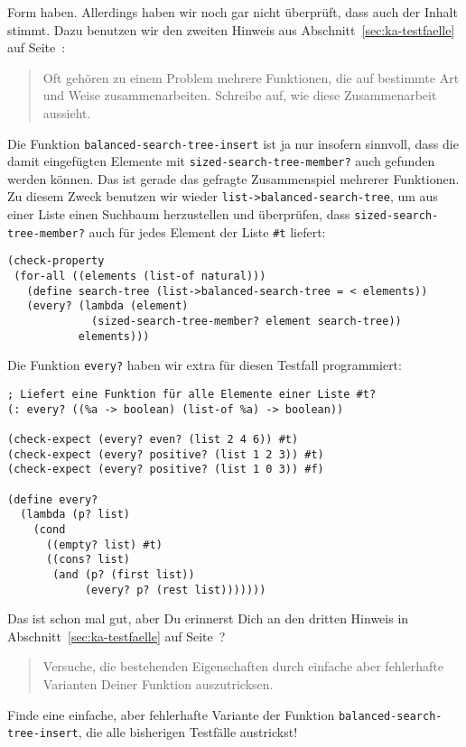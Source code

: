 Form haben.  Allerdings haben wir noch gar nicht überprüft, dass auch
der Inhalt stimmt.  Dazu benutzen wir den zweiten Hinweis aus
Abschnitt~\ref{sec:ka-testfaelle} auf
Seite~\pageref{sec:ka-testfaelle}:
%
\begin{quote}
  Oft gehören zu einem Problem mehrere Funktionen, die auf bestimmte
  Art und \mbox{Weise} zusammenarbeiten.  Schreibe auf, wie diese
  Zusammenarbeit aussieht.
\end{quote}
%
Die Funktion \lstinline{balanced-search-tree-insert} ist ja nur
insofern sinnvoll, dass die damit eingefügten Elemente mit
\lstinline{sized-search-tree-member?} auch gefunden werden können. Das
ist gerade das gefragte Zusammenspiel mehrerer Funktionen.  Zu diesem
Zweck benutzen wir wieder \lstinline{list->balanced-search-tree}, um
aus einer Liste einen Suchbaum herzustellen und überprüfen, dass
\lstinline{sized-search-tree-member?} auch für jedes Element der Liste
\lstinline{#t} liefert:
%
\begin{lstlisting}
(check-property
 (for-all ((elements (list-of natural)))
   (define search-tree (list->balanced-search-tree = < elements))
   (every? (lambda (element)
             (sized-search-tree-member? element search-tree))
           elements)))
\end{lstlisting}
%
Die Funktion \lstinline{every?} haben wir extra für diesen Testfall
programmiert:\label{func:everyp}
%
\begin{lstlisting}
; Liefert eine Funktion für alle Elemente einer Liste #t?
(: every? ((%a -> boolean) (list-of %a) -> boolean))

(check-expect (every? even? (list 2 4 6)) #t)
(check-expect (every? positive? (list 1 2 3)) #t)
(check-expect (every? positive? (list 1 0 3)) #f)

(define every?
  (lambda (p? list)
    (cond
      ((empty? list) #t)
      ((cons? list)
       (and (p? (first list))
            (every? p? (rest list)))))))
\end{lstlisting}
%
Das ist schon mal gut, aber Du erinnerst Dich an den dritten Hinweis in
Abschnitt~\ref{sec:ka-testfaelle} auf
Seite~\pageref{sec:ka-testfaelle}?
%
\begin{quote}
  Versuche, die bestehenden Eigenschaften durch einfache aber
  fehlerhafte Varianten Deiner Funktion auszutricksen.
\end{quote}
%
\begin{aufgabeinline}
  Finde eine einfache, aber fehlerhafte Variante der Funktion
  \lstinline{balanced-search-tree-insert}, die alle bisherigen
  Testfälle austrickst!
\end{aufgabeinline}
